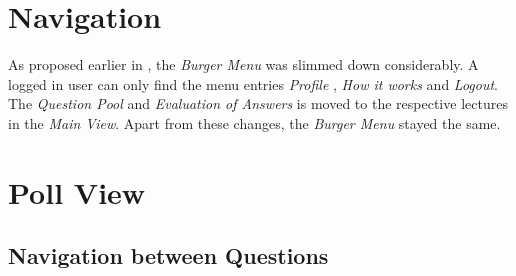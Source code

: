 \section{Navigation}
As proposed earlier in , the \emph{Burger Menu} was slimmed down considerably. A logged in user can only find the menu entries \emph{Profile}
, \emph{How it works} and \emph{Logout}.
The \emph{Question Pool} and \emph{Evaluation of Answers} is moved to the respective lectures in the \emph{Main View}. Apart from these changes, the \emph{Burger Menu} stayed the same.



\section{Poll View}


\subsection{Navigation between Questions}

